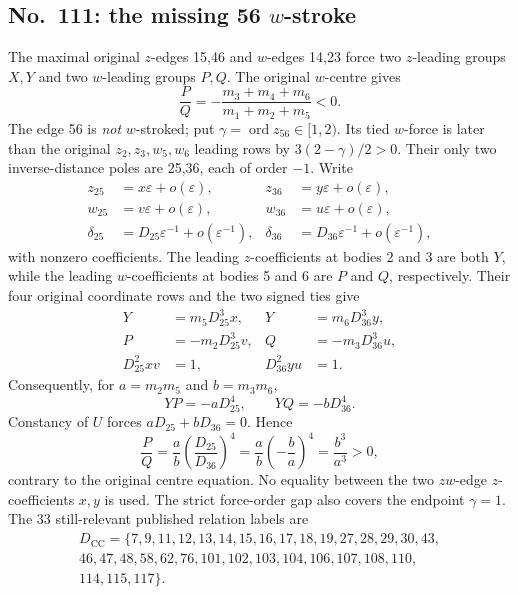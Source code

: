 \documentclass[11pt]{amsart}
\theoremstyle{remark}
\newcommand{\ord}{\operatorname{ord}}
\begin{document}
\subsection{No.~111: the missing 56 $w$-stroke}\label{sec:no111-wing}
The maximal original $z$-edges 15,46 and $w$-edges 14,23 force two $z$-leading groups $X,Y$ and two $w$-leading groups $P,Q$. The original $w$-centre gives
\begin{equation}\label{eq:no111-centre-ratio}
\frac P Q=-\frac{m_3+m_4+m_6}{m_1+m_2+m_5}<0.
\end{equation}
The edge 56 is \emph{not} $w$-stroked; put $\gamma=\ord z_{56}\in[1,2)$. Its tied $w$-force is later than the original $z_2,z_3,w_5,w_6$ leading rows by $3(2-\gamma)/2>0$. Their only two inverse-distance poles are 25,36, each of order $-1$. Write
\[
\begin{aligned}
z_{25}&=x\varepsilon+o(\varepsilon),&
z_{36}&=y\varepsilon+o(\varepsilon),\\
w_{25}&=v\varepsilon+o(\varepsilon),&
w_{36}&=u\varepsilon+o(\varepsilon),\\
\delta_{25}&=D_{25}\varepsilon^{-1}+o(\varepsilon^{-1}),&
\delta_{36}&=D_{36}\varepsilon^{-1}+o(\varepsilon^{-1}),
\end{aligned}
\]
with nonzero coefficients. The leading $z$-coefficients at bodies 2 and 3 are both $Y$, while the leading $w$-coefficients at bodies 5 and 6 are $P$ and $Q$, respectively. Their four original coordinate rows and the two signed ties give
\[
\begin{aligned}
Y&=m_5D_{25}^3x,&Y&=m_6D_{36}^3y,\\
P&=-m_2D_{25}^3v,&Q&=-m_3D_{36}^3u,\\
D_{25}^2xv&=1,&D_{36}^2yu&=1.
\end{aligned}
\]
Consequently, for $a=m_2m_5$ and $b=m_3m_6$,
\[
YP=-aD_{25}^4,\qquad YQ=-bD_{36}^4.
\]
Constancy of $U$ forces $aD_{25}+bD_{36}=0$. Hence
\[
\frac P Q=\frac a b\left(\frac{D_{25}}{D_{36}}\right)^4
=\frac a b\left(-\frac b a\right)^4
=\frac{b^3}{a^3}>0,
\]
contrary to the original centre equation. No equality between the two $zw$-edge $z$-coefficients $x,y$ is used. The strict force-order gap also covers the endpoint $\gamma=1$.
The 33 still-relevant published relation labels are
\begin{equation}\label{eq:published-roster}
\begin{gathered}
D_{\mathrm{CC}}=\{7,9,11,12,13,14,15,16,17,18,19,27,28,29,30,43,\\
46,47,48,58,62,76,101,102,103,104,106,107,108,110,\\
114,115,117\}.
\end{gathered}
\end{equation}
\end{document}
